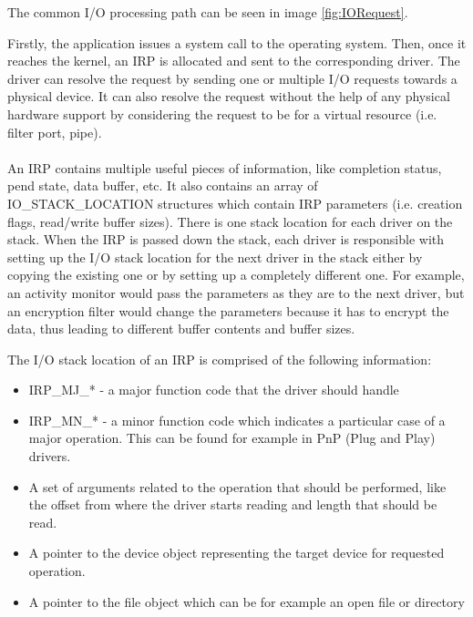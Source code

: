 		The common I/O processing path can be seen in image \ref{fig:IORequest}.

		Firstly, the application issues a system call to the operating system. Then, once it reaches the kernel, an IRP is allocated and sent to the corresponding driver. The driver can resolve the request by sending one or multiple I/O requests towards a physical device. It can also resolve the request without the help of any physical hardware support by considering the request to be for a virtual resource (i.e. filter port, pipe).
		
		
		\paragraph{}
		An IRP contains multiple useful pieces of information, like completion status, pend state, data buffer, etc. It also contains an array of IO\_STACK\_LOCATION structures which contain IRP parameters (i.e. creation flags, read/write buffer sizes). There is one stack location for each driver on the stack. When the IRP is passed down the stack, each driver is responsible with setting up the I/O stack location for the next driver in the stack either by copying the existing one or by setting up a completely different one. For example, an activity monitor would pass the parameters as they are to the next driver, but an encryption filter would change the parameters because it has to encrypt the data, thus leading to different buffer contents and buffer sizes.
		
		
		The I/O stack location of an IRP is comprised of the following information\cite{MSDNIOStackLocations}:
		\begin{itemize}
			\item IRP\_MJ\_*  - a major function code that the driver should handle
			\item IRP\_MN\_*  - a minor function code which indicates a particular case of a major operation. This can be found for example in PnP (Plug and Play) drivers. 
			\item A set of arguments related to the operation that should be performed, like the offset from where the driver starts reading and length that should be read.
			\item A pointer to the device object representing the target device for requested operation.
			\item A pointer to the file object which can be for example an open file or directory
		\end{itemize}
		
